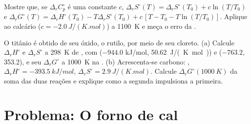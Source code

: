 \begin{exercise}[$\star\star\star$]\label{exo:b2:reaction-free-energy:11}
Mostre que, se $\Delta_r C^\circ_p$ é uma constante $c$,
$\Delta_r S^\circ(T) = \Delta_r S^\circ(T_0) + c\ln(T/T_0)$ e
$\Delta_r G^\circ(T) = \Delta_r H^\circ(T_0) - T\Delta_r S^\circ(T_0) +
c\,[T - T_0 - T\ln(T/T_0)]$. Aplique ao calcário ($c =
\qty{-2.0}{J/(K.mol)}$) a \qty{1100}{K} e meça o erro da
.
\end{exercise}

\begin{exercise}[$\star\star\star$]\label{exo:b2:reaction-free-energy:12}
O titânio é obtido de seu óxido, o rutilo, por meio de seu cloreto. (a) Calcule
$\Delta_r H^\circ$ e $\Delta_r S^\circ$ a \qty{298}{K} de , com  ($-944.0$ \unit{kJ/mol},
\qty{50.62}{J/(K.mol)}) e  ($-763.2$, 353.2), e seu
$\Delta_r G^\circ$ a \qty{1000}{K} na .
(b) Acrescenta-se carbono: , $\Delta_r H^\circ =
\qty{-393.5}{kJ/mol}$, $\Delta_r S^\circ = \qty{+2.9}{J/(K.mol)}$. Calcule
$\Delta_r G^\circ(\qty{1000}{K})$ da soma das duas reações e
explique como a segunda impulsiona a primeira.
\end{exercise}

\section{Problema: O forno de cal}


